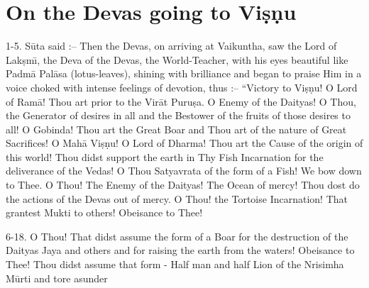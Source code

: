 \chapter{On the Devas going to Vi\d{s}\d{n}u}

1-5. S\=uta said :-- Then the Devas, on arriving at Vaikuntha, saw the Lord of Lak\d{s}m\={\i}, the Deva of the Devas, the World-Teacher, with his eyes beautiful like Padm\=a Pal\=asa (lotus-leaves), shining with brilliance and began to praise Him in a voice choked with intense feelings of devotion, thus :-- ``Victory to Vi\d{s}\d{n}u! O Lord of Ram\=a! Thou art prior to the Vir\=at Puru\d{s}a. O Enemy of the Daityas! O Thou, the Generator of desires in all and the Bestower of the fruits of those desires to all! O Gobinda! Thou art the Great Boar and Thou art of the nature of Great Sacrifices! O Mah\=a Vi\d{s}\d{n}u! O Lord of Dharma! Thou art the Cause of the origin of this world! Thou didst support the earth in Thy Fish Incarnation for the deliverance of the Vedas! O Thou Satyavrata of the form of a Fish! We bow down to Thee. O Thou! The Enemy of the Daityas! The Ocean of mercy! Thou dost do the actions of the Devas out of mercy. O Thou! the Tortoise Incarnation! That grantest Mukti to others! Obeisance to Thee!

6-18. O Thou! That didst assume the form of a Boar for the destruction of the Daityas Jaya and others and for raising the earth from the waters! Obeisance to Thee! Thou didst assume that form - Half man and half Lion of the Nrisimha M\=urti and tore asunder

